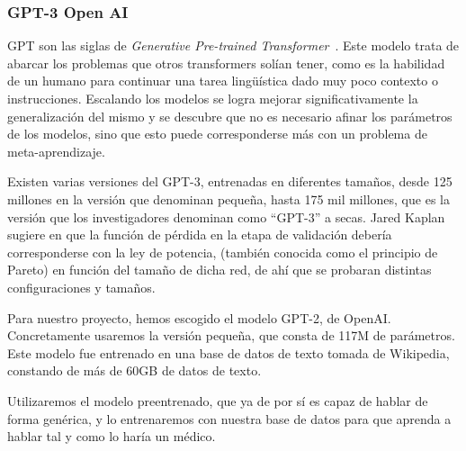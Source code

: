 \subsubsection{GPT-3 Open AI}
GPT son las siglas de \textit{Generative Pre-trained Transformer}~\cite{GPT3openAI2020}. Este modelo trata de abarcar los problemas que otros transformers solían tener, como es la habilidad de un humano para continuar una tarea lingüística dado muy poco contexto o instrucciones. Escalando los modelos se logra mejorar significativamente la generalización del mismo y se descubre que no es necesario afinar los parámetros de los modelos, sino que esto puede corresponderse más con un problema de meta-aprendizaje.

Existen varias versiones del GPT-3, entrenadas en diferentes tamaños, desde 125 millones en la versión que denominan pequeña, hasta 175 mil millones, que es la versión que los investigadores denominan como ``GPT-3'' a secas. Jared Kaplan sugiere en \cite{kaplan2020scaling} que la función de pérdida en la etapa de validación debería corresponderse con la ley de potencia, (también conocida como el principio de Pareto) en función del tamaño de dicha red, de ahí que se probaran distintas configuraciones y tamaños.

Para nuestro proyecto, hemos escogido el modelo GPT-2, de OpenAI. Concretamente usaremos la versión pequeña, que consta de 117M de parámetros. Este modelo fue entrenado en una base de datos de texto tomada de Wikipedia, constando de más de 60GB de datos de texto. 

Utilizaremos el modelo preentrenado, que ya de por sí es capaz de hablar de forma genérica, y lo entrenaremos con nuestra base de datos para que aprenda a hablar tal y como lo haría un médico.



